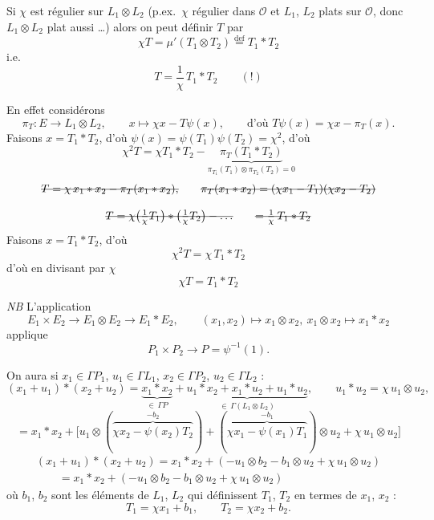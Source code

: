 \documentclass[11pt,a4paper]{article}
\begin{document}
Si $\chi$ est régulier sur \struck{\ill{}} $L_1 \otimes L_2$ (p.ex.\ $\chi$ régulier dans $\mathcal{O}$ et $L_1$, $L_2$ plats sur $\mathcal{O}$, donc $L_1 \otimes L_2$ plat aussi …) alors on peut définir $T$ par
\[
  \chi T = \mu'(T_1 \otimes T_2) \overset{\mathrm{def}}{=} T_1 * T_2
\]
i.e.
\[
  T = \frac{1}{\chi}\, T_1 * T_2 \qquad (!)
\]

 En effet considérons
\[
  \pi_T : E \to L_1 \otimes L_2, \qquad x \mapsto \chi x - T\psi(x),
  \qquad \text{d'où } T\psi(x) = \chi x - \pi_T(x).
\]
Faisons $x = T_1 * T_2$, d'où $\psi(x) = \psi(T_1)\psi(T_2) = \chi^2$, d'où
\[
  \chi^2 T = \chi T_1 * T_2 - \underbrace{\pi_T(T_1 * T_2)}_{\pi_{T_1}(T_1) \otimes \pi_{T_2}(T_2) = 0}
\]
\[
  \text{\struck{$T = \chi\, x_1 * x_2 - \pi_T(x_1 * x_2)$,}}
  \qquad
  \text{\struck{$\pi_T(x_1 * x_2) = (\chi x_1 - T_1)(\chi x_2 - T_2)$}}
\]

\[
  \text{\struck{$T = \chi\bigl(\tfrac{1}{\chi}T_1\bigr) * \bigl(\tfrac{1}{\chi}T_2\bigr) - \ldots$}}
  \qquad
  \text{\struck{$= \tfrac{1}{\chi}\, T_1 * T_2$}}
\]
Faisons $x = T_1 * T_2$, d'où
\[
  \chi^2 T = \chi\, T_1 * T_2
\]
d'où en divisant par $\chi$
\[
  \boxed{\chi T = T_1 * T_2}
\]

\emph{NB} L'application
\[
  E_1 \times E_2 \to E_1 \otimes E_2 \to E_1 * E_2,
  \qquad (x_1, x_2) \mapsto x_1 \otimes x_2,\ x_1 \otimes x_2 \mapsto x_1 * x_2
\]
applique
\[
  P_1 \times P_2 \to P = \psi^{-1}(1).
\]

On aura si $x_1 \in \Gamma P_1$, $u_1 \in \Gamma L_1$, $x_2 \in \Gamma P_2$, $u_2 \in \Gamma L_2$ :
\[
  (x_1 + u_1) * (x_2 + u_2) = \underbrace{x_1 * x_2}_{\in\, \Gamma P}
  + \underbrace{u_1 * x_2 + x_1 * u_2 + u_1 * u_2}_{\in\, \Gamma(L_1 \otimes L_2)},
  \qquad u_1 * u_2 = \chi\, u_1 \otimes u_2,
\]
\[
  = x_1 * x_2 + \bigl[u_1 \otimes (\overbrace{\chi x_2 - \psi(x_2)T_2}^{-b_2})
  + (\overbrace{\chi x_1 - \psi(x_1)T_1}^{-b_1}) \otimes u_2
  + \chi\, u_1 \otimes u_2\bigr]
\]
\[
  \boxed{\begin{array}{l}
  (x_1 + u_1) * (x_2 + u_2) = x_1 * x_2 + (-u_1 \otimes b_2 - b_1 \otimes u_2 + \chi\, u_1 \otimes u_2) \\
  \qquad = x_1 * x_2 + (-u_1 \otimes b_2 - b_1 \otimes u_2 + \chi\, u_1 \otimes u_2)
  \end{array}}
\]
où $b_1$, $b_2$ sont les éléments de $L_1$, $L_2$ qui définissent $T_1$, $T_2$ en termes de $x_1$, $x_2$ :
\[
  T_1 = \chi x_1 + b_1, \qquad T_2 = \chi x_2 + b_2 .
\]
\end{document}
